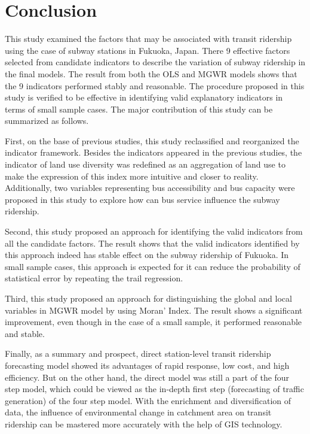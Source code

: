 \section{Conclusion}
%
This study examined the factors that may be associated with transit ridership using the case of subway stations in Fukuoka, Japan. There 9 effective factors selected from candidate indicators to describe the variation of subway ridership in the final models. The result from both the OLS and MGWR models shows that the 9 indicators performed stably and reasonable. The procedure proposed in this study is verified to be effective in identifying valid explanatory indicators in terms of small sample cases. The major contribution of this study can be summarized as follows.

%
First, on the base of previous studies, this study reclassified and reorganized the indicator framework. Besides the indicators appeared in the previous studies, the indicator of land use diversity was redefined as an aggregation of land use to make the expression of this index more intuitive and closer to reality. Additionally, two variables representing bus accessibility and bus capacity were proposed in this study to explore how can bus service influence the subway ridership.

%
Second, this study proposed an approach for identifying the valid indicators from all the candidate factors. The result shows that the valid indicators identified by this approach indeed has stable effect on the subway ridership of Fukuoka. In small sample cases, this approach is expected for it can reduce the probability of statistical error by repeating the trail regression.

%
Third, this study proposed an approach for distinguishing the global and local variables in MGWR model by using Moran’ Index. The result shows a significant improvement, even though in the case of a small sample, it performed reasonable and stable.

%
Finally, as a summary and prospect, direct station-level transit ridership forecasting model showed its advantages of rapid response, low cost, and high efficiency. But on the other hand, the direct model was still a part of the four step model, which could be viewed as the in-depth first step (forecasting of traffic generation) of the four step model. With the enrichment and diversification of data, the influence of environmental change in catchment area on transit ridership can be mastered more accurately with the help of GIS technology.

\clearpage %

